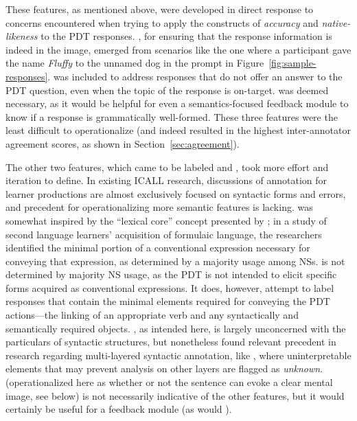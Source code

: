 These features, as mentioned above, were developed in direct response to concerns encountered when trying to apply the constructs of \textit{accuracy} and \textit{native-likeness} to the PDT responses. , for ensuring that the response information is indeed in the image, emerged from scenarios like the one where a participant gave the name \textit{Fluffy} to the unnamed dog in the prompt in Figure~\ref{fig:sample-responses}.  was included to address responses that do not offer an answer to the PDT question, even when the topic of the response is on-target.  was deemed necessary, as it would be helpful for even a semantics-focused feedback module to know if a response is grammatically well-formed. These three features were the least difficult to operationalize (and indeed resulted in the highest inter-annotator agreement scores, as shown in Section~\ref{sec:agreement}).

The other two features, which came to be labeled  and , took more effort and iteration to define. In existing ICALL research, discussions of annotation for learner productions are almost exclusively focused on syntactic forms and errors, and precedent for operationalizing more semantic features is lacking.  was somewhat inspired by the ``lexical core'' concept presented by \citet{bardovi2017unconventional}; in a study of second language learners' acquisition of formulaic language, the researchers identified the minimal portion of a conventional expression necessary for conveying that expression, as determined by a majority usage among NSs.  is not determined by majority NS usage, as the PDT is not intended to elicit specific forms acquired as conventional expressions. It does, however, attempt to label responses that contain the minimal elements required for conveying the PDT actions---the linking of an appropriate verb and any syntactically and semantically required objects. , as intended here, is largely unconcerned with the particulars of syntactic structures, but nonetheless found relevant precedent in research regarding multi-layered syntactic annotation, like \citet{ragheb2014developing}, where uninterpretable elements that may prevent analysis on other layers are flagged as \textit{unknown}.  (operationalized here as whether or not the sentence can evoke a clear mental image, see below) is not necessarily indicative of the other features, but it would certainly be useful for a feedback module (as would ).

